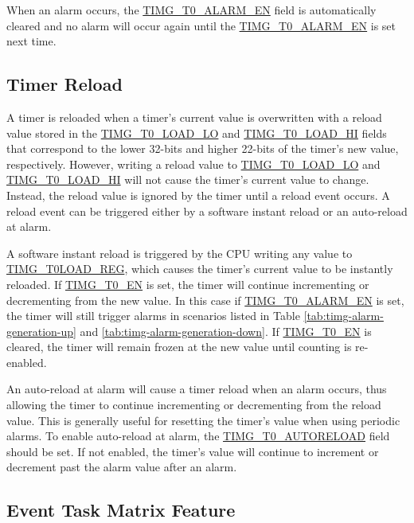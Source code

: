 \documentclass[main\_\_EN.tex]{subfiles}
\begin{document}
When an alarm occurs, the \hyperref[fielddesc:TIMGTXALARMEN]{TIMG\_T0\_ALARM\_EN} field is automatically cleared and no alarm will occur again until the \hyperref[fielddesc:TIMGTXALARMEN]{TIMG\_T0\_ALARM\_EN} is set next time.



\subsection{Timer Reload} \label{sec:timg-func-descr-reload}
A timer is reloaded when a timer's current value is overwritten with a reload value stored in the \hyperref[fielddesc:TIMGTXLOADLO]{TIMG\_T0\_LOAD\_LO} and \hyperref[fielddesc:TIMGTXLOADHI]{TIMG\_T0\_LOAD\_HI} fields that correspond to the lower 32-bits and higher 22-bits of the timer's new value, respectively. However, writing a reload value to \hyperref[fielddesc:TIMGTXLOADLO]{TIMG\_T0\_LOAD\_LO} and \hyperref[fielddesc:TIMGTXLOADHI]{TIMG\_T0\_LOAD\_HI} will not cause the timer's current value to change. Instead, the reload value is ignored by the timer until a reload event occurs. A reload event can be triggered either by a software instant reload or an auto-reload at alarm.

A software instant reload is triggered by the CPU writing any value to \hyperref[regdesc:TIMGTXLOADREG]{TIMG\_T0LOAD\_REG}, which causes the timer's current value to be instantly reloaded. If \hyperref[fielddesc:TIMGTXEN]{TIMG\_T0\_EN} is set, the timer will continue incrementing or decrementing from the new value. In this case if \hyperref[fielddesc:TIMGTXALARMEN]{TIMG\_T0\_ALARM\_EN} is set, the timer will still trigger alarms in scenarios listed in Table \ref{tab:timg-alarm-generation-up} and \ref{tab:timg-alarm-generation-down}. If \hyperref[fielddesc:TIMGTXEN]{TIMG\_T0\_EN} is cleared, the timer will remain frozen at the new value until counting is re-enabled. 

An auto-reload at alarm will cause a timer reload when an alarm occurs, thus allowing the timer to continue incrementing or decrementing from the reload value. This is generally useful for resetting the timer's value when using periodic alarms. To enable auto-reload at alarm, the \hyperref[fielddesc:TIMGTXAUTORELOAD]{TIMG\_T0\_AUTORELOAD} field should be set. If not enabled, the timer's value will continue to increment or decrement past the alarm value after an alarm.


\subsection{Event Task Matrix Feature} \label{sec:timg-etm-func}
\end{document}
